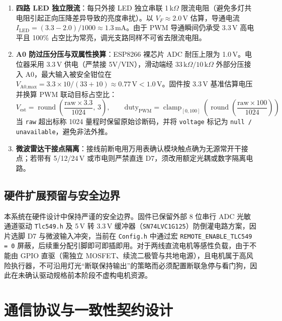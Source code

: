 \documentclass[10.5pt,a4paper]{ctexart}
\newcommand{\code}[1]{{\ttfamily\small\nolinkurl{#1}}}
\begin{document}
\begin{enumerate}
    \item \textbf{四路 LED 独立限流}：每只外接 LED 独立串联 1\,k$\Omega$ 限流电阻（避免多灯共电阻引起正向压降差异导致的亮度串扰）。以 $V_F \approx 2.0\,\text{V}$ 估算，导通电流 $I_{\text{LED}} = (3.3 - 2.0)/1000 \approx 1.3\,\text{mA}$。由于 PWM 导通瞬间仍承受 3.3\,V 高电平且 100\% 占空比为常亮，调光支路同样不可省去限流电阻。
    \item \textbf{A0 防过压分压与双属性换算}：ESP8266 裸芯片 ADC 耐压上限为 1.0\,V。电位器采用 3.3\,V 供电（严禁接 5V/VIN），滑动端经 $33\,\text{k}\Omega / 10\,\text{k}\Omega$ 外部分压接入 A0，最大输入被安全钳位在 $V_{\text{A0,max}} = 3.3 \times 10/(33+10) \approx 0.77\,\text{V} < 1.0\,\text{V}$。固件按 3.3\,V 基准估算电压并换算 PWM 联动目标占空比：
    \begin{equation}
        V_{\text{est}} = \operatorname{round}\!\left(\frac{\text{raw} \times 3.3}{1024},\, 3\right), \qquad \text{duty}_{\text{PWM}} = \operatorname{clamp}_{[0,100]}\!\left(\operatorname{round}\!\left(\frac{\text{raw} \times 100}{1024}\right)\right)
    \end{equation}
    当 \code{raw} 超出标称 1024 量程时保留原始诊断码，并将 \code{voltage} 标记为 \code{null / unavailable}，避免非法外推。
    \item \textbf{微波雷达干接点隔离}：接线前断电用万用表确认模块触点确为无源常开干接点；若带有 5/12/24\,V 或市电则严禁直连 D7，须改用额定光耦或数字隔离电路。
\end{enumerate}

\subsection{硬件扩展预留与安全边界}
本系统在硬件设计中保持严谨的安全边界。固件已保留外部 8 位串行 ADC 光敏通道驱动 \code{Tlc549.h} 及 5\,V 转 3.3\,V 缓冲器（\code{SN74LVC1G125}）防倒灌电路方案，因片选脚 D7 与微波输入冲突，当前在 \code{Config.h} 中通过宏 \code{REMOTE_ENABLE_TLC549 = 0} 屏蔽，后续重分配引脚即可即插即用。对于两线直流电机等感性负载，由于不能由 GPIO 直驱（需独立 MOSFET、续流二极管与共地电源），且电机属于高风险执行器，不可沿用灯光“断联保持输出”的策略而必须配置断联急停与看门狗，因此在未确认驱动规格前本阶段不虚构电机资源。

\section{通信协议与一致性契约设计}
\end{document}
